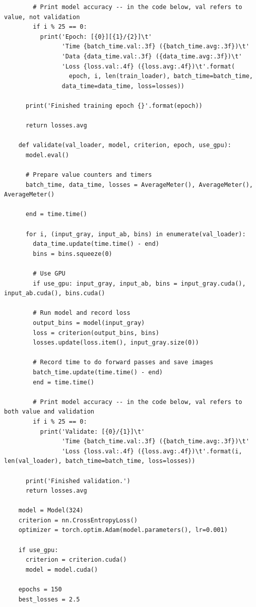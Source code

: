 \begin{longlisting}
\begin{verbatim}
        # Print model accuracy -- in the code below, val refers to value, not validation
        if i % 25 == 0:
          print('Epoch: [{0}][{1}/{2}]\t'
                'Time {batch_time.val:.3f} ({batch_time.avg:.3f})\t'
                'Data {data_time.val:.3f} ({data_time.avg:.3f})\t'
                'Loss {loss.val:.4f} ({loss.avg:.4f})\t'.format(
                  epoch, i, len(train_loader), batch_time=batch_time,
                data_time=data_time, loss=losses))

      print('Finished training epoch {}'.format(epoch))

      return losses.avg

    def validate(val_loader, model, criterion, epoch, use_gpu):
      model.eval()

      # Prepare value counters and timers
      batch_time, data_time, losses = AverageMeter(), AverageMeter(), AverageMeter()

      end = time.time()

      for i, (input_gray, input_ab, bins) in enumerate(val_loader):
        data_time.update(time.time() - end)
        bins = bins.squeeze(0)

        # Use GPU
        if use_gpu: input_gray, input_ab, bins = input_gray.cuda(), input_ab.cuda(), bins.cuda()

        # Run model and record loss
        output_bins = model(input_gray)
        loss = criterion(output_bins, bins)
        losses.update(loss.item(), input_gray.size(0))

        # Record time to do forward passes and save images
        batch_time.update(time.time() - end)
        end = time.time()

        # Print model accuracy -- in the code below, val refers to both value and validation
        if i % 25 == 0:
          print('Validate: [{0}/{1}]\t'
                'Time {batch_time.val:.3f} ({batch_time.avg:.3f})\t'
                'Loss {loss.val:.4f} ({loss.avg:.4f})\t'.format(i, len(val_loader), batch_time=batch_time, loss=losses))

      print('Finished validation.')
      return losses.avg

    model = Model(324)
    criterion = nn.CrossEntropyLoss()
    optimizer = torch.optim.Adam(model.parameters(), lr=0.001)

    if use_gpu:
      criterion = criterion.cuda()
      model = model.cuda()

    epochs = 150
    best_losses = 2.5


\end{verbatim}
\end{longlisting}
